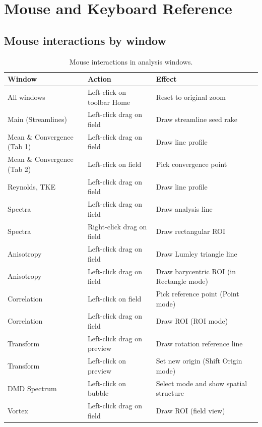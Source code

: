 \chapter{Mouse and Keyboard Reference}

\section{Mouse interactions by window}

\begin{table}[htbp]
\centering
\caption{Mouse interactions in analysis windows.}
\begin{tabular}{lp{4cm}p{6.5cm}}
\toprule
\textbf{Window} & \textbf{Action} & \textbf{Effect} \\
\midrule
All windows       & Left-click on toolbar Home & Reset to original zoom \\
Main (Streamlines) & Left-click drag on field & Draw streamline seed rake \\
Mean \& Convergence (Tab 1) & Left-click drag on field & Draw line profile \\
Mean \& Convergence (Tab 2) & Left-click on field & Pick convergence point \\
Reynolds, TKE     & Left-click drag on field & Draw line profile \\
Spectra           & Left-click drag on field & Draw analysis line \\
Spectra           & Right-click drag on field & Draw rectangular ROI \\
Anisotropy        & Left-click drag on field & Draw Lumley triangle line \\
Anisotropy        & Left-click drag on field & Draw barycentric ROI (in Rectangle mode) \\
Correlation       & Left-click on field & Pick reference point (Point mode) \\
Correlation       & Left-click drag on field & Draw ROI (ROI mode) \\
Transform         & Left-click drag on preview & Draw rotation reference line \\
Transform         & Left-click on preview & Set new origin (Shift Origin mode) \\
DMD Spectrum      & Left-click on bubble & Select mode and show spatial structure \\
Vortex            & Left-click drag on field & Draw ROI (field view) \\
\bottomrule
\end{tabular}
\end{table}

